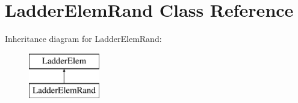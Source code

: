 \hypertarget{class_ladder_elem_rand}{\section{Ladder\-Elem\-Rand Class Reference}
\label{class_ladder_elem_rand}
}
Inheritance diagram for Ladder\-Elem\-Rand\-:\begin{figure}[H]
\begin{center}
\leavevmode
\includegraphics[height=2.000000cm]{class_ladder_elem_rand}
\end{center}
\end{figure}
